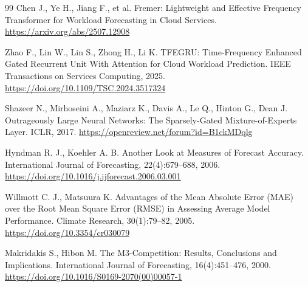 \documentclass[UTF8]{ctexart}
\begin{document}
\begin{thebibliography}{99}
Chen J., Ye H., Jiang F., et al. Fremer: Lightweight and Effective Frequency Transformer for Workload Forecasting in Cloud Services. \url{https://arxiv.org/abs/2507.12908}

Zhao F., Lin W., Lin S., Zhong H., Li K. TFEGRU: Time-Frequency Enhanced Gated Recurrent Unit With Attention for Cloud Workload Prediction. IEEE Transactions on Services Computing, 2025. \url{https://doi.org/10.1109/TSC.2024.3517324}

Shazeer N., Mirhoseini A., Maziarz K., Davis A., Le Q., Hinton G., Dean J. Outrageously Large Neural Networks: The Sparsely-Gated Mixture-of-Experts Layer. ICLR, 2017. \url{https://openreview.net/forum?id=B1ckMDqlg}

Hyndman R. J., Koehler A. B. Another Look at Measures of Forecast Accuracy. International Journal of Forecasting, 22(4):679--688, 2006. \url{https://doi.org/10.1016/j.ijforecast.2006.03.001}

Willmott C. J., Matsuura K. Advantages of the Mean Absolute Error (MAE) over the Root Mean Square Error (RMSE) in Assessing Average Model Performance. Climate Research, 30(1):79--82, 2005. \url{https://doi.org/10.3354/cr030079}

Makridakis S., Hibon M. The M3-Competition: Results, Conclusions and Implications. International Journal of Forecasting, 16(4):451--476, 2000. \url{https://doi.org/10.1016/S0169-2070(00)00057-1}
\end{thebibliography}
\end{document}
